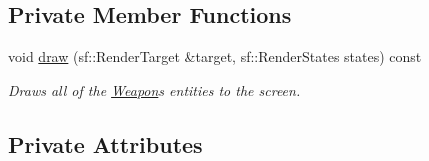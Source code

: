 \subsection*{Private Member Functions}
\begin{DoxyCompactItemize}
\item 
void \hyperlink{class_weapon_a979a2ea89a3fb50503b7619d437861f3}{draw} (sf\+::\+Render\+Target \&target, sf\+::\+Render\+States states) const
\begin{DoxyCompactList}\small\item\em Draws all of the \hyperlink{class_weapon}{Weapon}\textquotesingle{}s entities to the screen. \end{DoxyCompactList}\end{DoxyCompactItemize}
\subsection*{Private Attributes}

